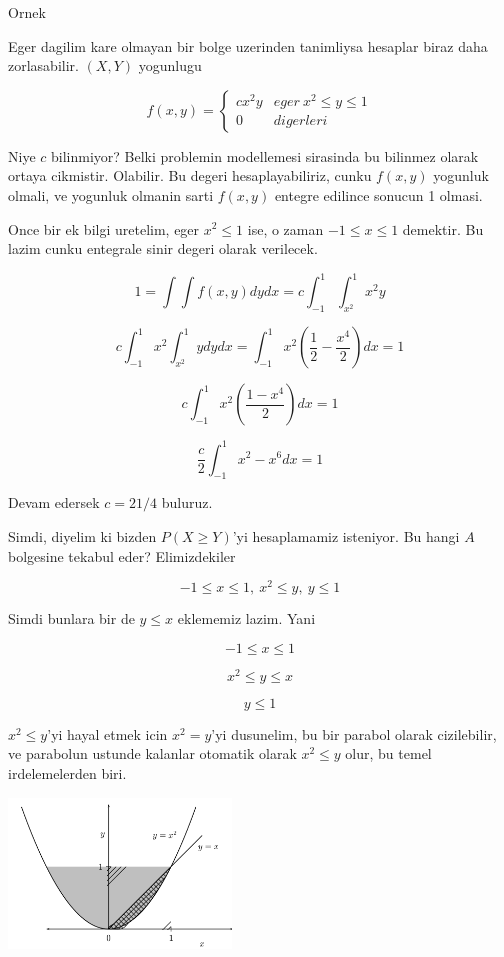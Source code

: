 \documentclass[12pt,fleqn]{article}\usepackage{../common}
\begin{document}
Ornek 

Eger dagilim kare olmayan bir bolge uzerinden tanimliysa hesaplar biraz
daha zorlasabilir. $(X,Y)$ yogunlugu 

\[ 
f(x,y) = 
\left\{ \begin{array}{ll}
cx^2y & eger \ x^2 \le y \le 1 \\
0 & digerleri
\end{array} \right.
 \]

Niye $c$ bilinmiyor? Belki problemin modellemesi sirasinda bu bilinmez
olarak ortaya cikmistir. Olabilir. Bu degeri hesaplayabiliriz, cunku
$f(x,y)$ yogunluk olmali, ve yogunluk olmanin sarti $f(x,y)$ entegre
edilince sonucun 1 olmasi. 

Once bir ek bilgi uretelim, eger $x^2 \le 1$ ise, o zaman $-1 \le x \le
1$ 
demektir. Bu lazim cunku entegrale sinir degeri olarak verilecek. 

\[ 1 = \int  \int f(x,y) dy dx = c \int _{ -1}^{1} \int _{ x^2}^{1}x^2y  \]

\[ c \int _{ -1}^{1} x^2 \int _{ x^2}^{1} y dy dx = 
\int _{ -1}^{1} x^2 (\frac{ 1}{2} - \frac{ x^4}{2} )dx = 1
 \]

\[ c \int _{ -1}^{1} x^2 (\frac{ 1 - x^4}{2} ) dx = 1 \]

\[ \frac{ c}{2} \int _{ -1}^{1} x^2 - x^6 dx  = 1\]

Devam edersek $c = 21/4$ buluruz. 

Simdi, diyelim ki bizden $P(X \ge Y)$'yi hesaplamamiz isteniyor. Bu hangi
$A$ bolgesine tekabul eder? Elimizdekiler

\[ -1 \le x \le 1, \  x^2 \le y, \ y \le 1   \]

Simdi bunlara bir de $y \le x$ eklememiz lazim. Yani

\[ -1 \le x \le 1 \]

\[  x^2 \le y \le x \]

\[  y \le 1   \]

$x^2 \le y$'yi hayal etmek icin $x^2 = y$'yi dusunelim, bu bir parabol
olarak cizilebilir, ve parabolun ustunde kalanlar otomatik olarak $x^2 \le
y$ 
olur, bu temel irdelemelerden biri. 


\includegraphics[height=4cm]{2_1.png}
\end{document}
